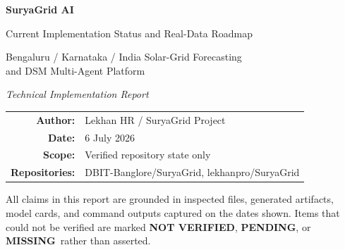 \documentclass[11pt,a4paper]{article}
\newcommand{\stPend}{\textcolor{cpart}{\textbf{PENDING}}}
\newcommand{\stM}{\textcolor{cmiss}{\textbf{MISSING}}}
\newcommand{\stNV}{\textcolor{cnv}{\textbf{NOT VERIFIED}}}
\begin{document}
\begin{titlepage}
\centering
\vspace*{2.2cm}
{\Huge\bfseries SuryaGrid AI\par}
\vspace{0.5cm}
{\LARGE Current Implementation Status and Real-Data Roadmap\par}
\vspace{0.8cm}
{\large Bengaluru / Karnataka / India Solar-Grid Forecasting\\ and DSM Multi-Agent Platform\par}
\vspace{2cm}
{\large\itshape Technical Implementation Report\par}
\vspace{1.5cm}
\begin{tabular}{rl}
\textbf{Author:} & Lekhan HR / SuryaGrid Project\\[4pt]
\textbf{Date:} & 6 July 2026\\[4pt]
\textbf{Scope:} & Verified repository state only\\[4pt]
\textbf{Repositories:} & DBIT-Banglore/SuryaGrid, lekhanpro/SuryaGrid\\
\end{tabular}
\vfill
{\footnotesize All claims in this report are grounded in inspected files, generated
artifacts, model cards, and command outputs captured on the dates shown. Items that
could not be verified are marked \stNV, \stPend, or \stM\ rather than asserted.\par}
\end{titlepage}

\tableofcontents
\newpage

\end{document}
